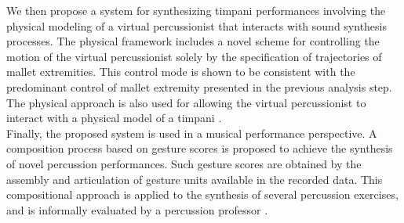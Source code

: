 We then propose a system for synthesizing timpani performances involving the physical modeling of a virtual percussionist that interacts with sound synthesis processes. The physical framework includes a novel scheme for controlling the motion of the virtual percussionist solely by the specification of trajectories of mallet extremities. This control mode is shown to be consistent with the predominant control of mallet extremity presented in the previous analysis step. The physical approach is also used for allowing the virtual percussionist to interact with a physical model of a timpani .\\

Finally, the proposed system is used in a musical performance perspective. A composition process based on gesture scores is proposed to achieve the synthesis of novel percussion performances. Such gesture scores are obtained by the assembly and articulation of gesture units available in the recorded data. This compositional approach is applied to the synthesis of several percussion exercises, and is informally evaluated by a percussion professor .






